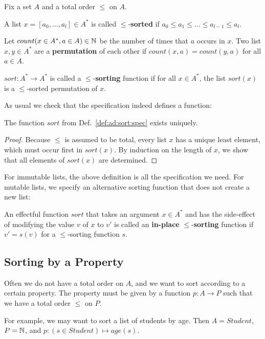 \begin{definition}[Sorting]
Fix a set $A$ and a total order $\leq$ on $A$.

A list $x=[a_0,\ldots,a_l]\in A^*$ is called $\leq$-\textbf{sorted} if $a_0\leq a_1 \leq \ldots \leq a_{l-1}\leq a_l$.

Let $count(x\in A^*,a\in A)\in\mathbb{N}$ be the number of times that $a$ occurs in $x$.
Two list $x,y\in A^*$ are a \textbf{permutation} of each other if $count(x,a)=count(y,a)$ for all $a\in A$.

$sort:A^*\to A^*$ is called a $\leq$-\textbf{sorting} function if for all $x\in A^*$, the list $sort(x)$ is a $\leq$-sorted permutation of $x$.
\end{definition}

As usual we check that the specification indeed defines a function:

\begin{theorem}[Uniqueness]
The function $sort$ from Def.~\ref{def:ad:sort:spec} exists uniquely.
\end{theorem}
\begin{proof}
Because $\leq$ is assumed to be total, every list $x$ has a unique least element, which must occur first in $sort(x)$.
By induction on the length of $x$, we show that all elements of $sort(x)$ are determined.
\end{proof}

For immutable lists, the above definition is all the specification we need.
For mutable lists, we specify an alternative sorting function that does not create a new list:

\begin{definition}
An effectful function $sort$ that takes an argument $x\in A^*$ and has the side-effect of modifying the value $v$ of $x$ to $v'$ is called an \textbf{in-place} $\leq$-\textbf{sorting} function if $v'=s(v)$ for a $\leq$-sorting function $s$.
\end{definition}

\subsection{Sorting by a Property}\label{sec:ad:sort:stable}

Often we do not have a total order on $A$, and we want to sort according to a certain property.
The property must be given by a function $p:A\to P$ such that we have a total order $\leq$ on $P$.

For example, we may want to sort a list of students by age.
Then $A=Student$, $P=\mathbb{N}$, and $p:(s\in Student)\mapsto age(s)$.

